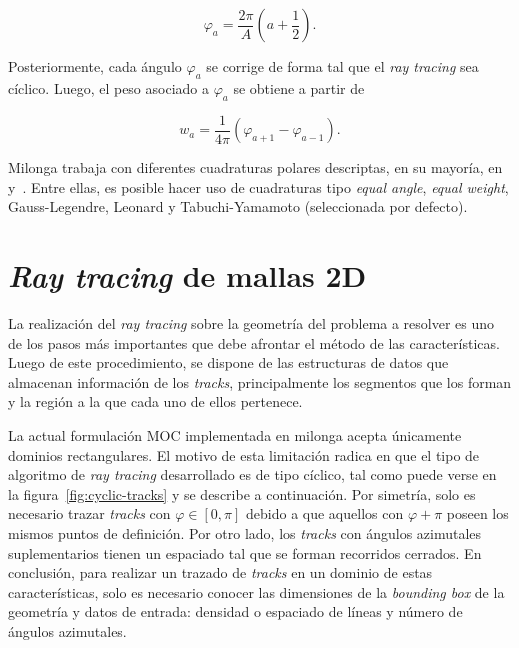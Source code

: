 \documentclass[11pt]{article}
\numberwithin{equation}{section}
\begin{document}
\begin{equation}
 \varphi_a = \frac{2\pi}{A} \left( a + \frac{1}{2} \right).
\end{equation}

\noindent
Posteriormente, cada ángulo $\varphi_a$ se corrige de forma tal que el \emph{ray tracing} sea cíclico. Luego, el peso asociado a $\varphi_a$ se obtiene a partir de

\begin{equation}
 w_a = \frac{1}{4\pi} \left( \varphi_{a+1} - \varphi_{a-1} \right).
\end{equation}

Milonga trabaja con diferentes cuadraturas polares descriptas, en su mayoría, en~\cite{handbook-ingnuclear} y~\cite{tabuchi}. Entre ellas, es posible hacer uso de cuadraturas tipo \emph{equal angle}, \emph{equal weight}, Gauss-Legendre, Leonard y Tabuchi-Yamamoto (seleccionada por defecto).


\section{\emph{Ray tracing} de mallas 2D} \label{sec:ray-tracing}

La realizaci\'on del \emph{ray tracing} sobre la geometría del problema a resolver es uno de los pasos más importantes que debe afrontar el método de las características. Luego de este procedimiento, se dispone de las estructuras de datos que almacenan información de los \emph{tracks}, principalmente los segmentos que los forman y la región a la que cada uno de ellos pertenece. 

La actual formulación MOC implementada en milonga acepta únicamente dominios rectangulares. El motivo de esta limitación radica en que el tipo de algoritmo de \emph{ray tracing} desarrollado es de tipo c\'iclico, tal como puede verse en la figura~\ref{fig:cyclic-tracks} y se describe a continuación. Por simetr\'ia, solo es necesario trazar \emph{tracks} con $\varphi \in \left[ 0, \pi \right]$ debido a que aquellos con $\varphi + \pi$ poseen los mismos puntos de definición. Por otro lado, los \emph{tracks} con ángulos azimutales suplementarios tienen un espaciado tal que se forman recorridos cerrados. En conclusión, para realizar un trazado de \emph{tracks} en un dominio de estas características, solo es necesario conocer las dimensiones de la \emph{bounding box} de la geometría y datos de entrada: densidad o espaciado de líneas y número de ángulos azimutales.
\end{document}

